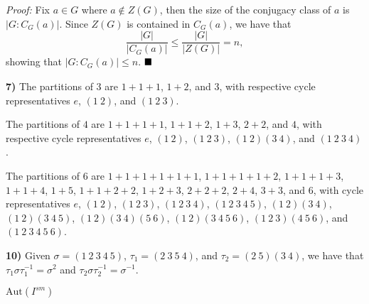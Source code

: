 \documentclass[12pt]{article}
\renewcommand{\t}[1]{\text{#1}}
\newcommand{\vertb}[1]{\left\vert#1\right\vert}
\newcommand{\proof}{\textit{Proof: }}
\newcommand{\done}{\ensuremath{\strut\hfill\blacksquare}}
\begin{document}
\proof
Fix \( a \in G \) where \( a \notin Z(G) \), then the size of the conjugacy
class of \( a \) is \( \vertb{G : C_G(a)} \).
Since \( Z(G) \) is contained in \( C_G(a) \), we have that
\[
	\frac{\vertb{G}}{\vertb{C_G(a)}}
	\leq \frac{\vertb{G}}{\vertb{Z(G)}}
	= n,
\]
showing that \( \vertb{G : C_G(a)} \leq n \).
\done

\textbf{7)}
The partitions of \( 3 \) are \( 1 + 1 + 1 \), \( 1 + 2 \), and \( 3 \), with
respective cycle representatives \( e \), \( (1\ 2) \), and \( (1\ 2\ 3) \).

The partitions of \( 4 \) are \( 1 + 1 + 1 + 1 \), \( 1 + 1 + 2 \),
\( 1 + 3 \), \( 2 + 2 \), and \( 4 \), with respective cycle representatives
\( e \), \( (1\ 2) \), \( (1\ 2\ 3) \), \( (1\ 2)(3\ 4) \), and
\( (1\ 2\ 3\ 4) \).

The partitions of \( 6 \) are \( 1 + 1 + 1 + 1 + 1 + 1 \),
\( 1 + 1 + 1 + 1 + 2 \), \( 1 + 1 + 1 + 3 \), \( 1 + 1 + 4 \), \( 1 + 5 \),
\( 1 + 1 + 2 + 2 \), \( 1 + 2 + 3 \), \( 2 + 2 + 2 \), \( 2 + 4 \),
\( 3 + 3 \), and \( 6 \), with cycle representatives \( e \), \( (1\ 2) \),
\( (1\ 2\ 3) \), \( (1\ 2\ 3\ 4) \), \( (1\ 2\ 3\ 4\ 5) \), \( (1\ 2)(3\ 4) \),
\( (1\ 2)(3\ 4\ 5) \), \( (1\ 2)(3\ 4)(5\ 6) \), \( (1\ 2)(3\ 4\ 5\ 6) \),
\( (1\ 2\ 3)(4\ 5\ 6) \), and \( (1\ 2\ 3\ 4\ 5\ 6) \).

\textbf{10)}
Given \( \sigma = (1\ 2\ 3\ 4\ 5) \), \( \tau_1 = (2\ 3\ 5\ 4) \), and
\( \tau_2 = (2\ 5)(3\ 4) \), we have that
\( \tau_1\sigma\tau_1^{-1} = \sigma^2 \) and
\( \tau_2\sigma\tau_2^{-1} = \sigma^{-1} \).

\( \t{Aut}(I^{sm}) \)
\end{document}
